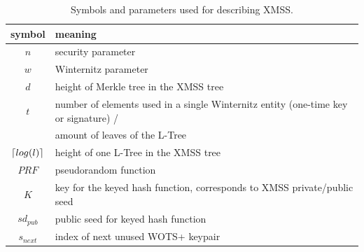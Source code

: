 \begin{table}
\begin{center}
\begin{tabular}{c l} 
 \hline
 symbol & meaning  \\ 
 \hline
 $n$ & security parameter \\ %
 $w$ & Winternitz parameter  \\ 
 $d$ & height of Merkle tree in the XMSS tree  \\ 
 $t$ & number of elements used in a single Winternitz entity (one-time key or signature) / \\ 
     & amount of leaves of the L-Tree \\ 
 $\lceil log(l)\rceil$ & height of one L-Tree in the XMSS tree \\
 $PRF$ & pseudorandom function \\
 $K$ & key for the keyed hash function, corresponds to XMSS private/public seed \\
 $sd_{pub}$ & public seed for keyed hash function \\
 $s_{next}$ & index of next unused WOTS+ keypair \\
 \hline
\end{tabular}
\caption{Symbols and parameters used for describing XMSS.}
\label{table:xmms_param}
\end{center}
\end{table}

